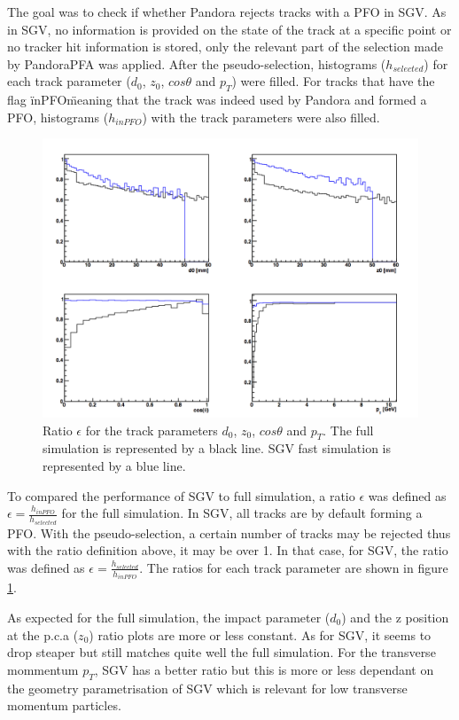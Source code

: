 The goal was to check if whether Pandora rejects tracks with a PFO in SGV. As in SGV, no information is provided on the state of the track at a specific point or no tracker hit information is stored, only the relevant part of the selection made by PandoraPFA was applied. After the pseudo-selection, histograms ($h_{selected}$) for each track parameter ($d_0$, $z_0$, $cos\theta$ and $p_T$) were filled. For tracks that have the flag \"inPFO\" meaning that the track was indeed used by Pandora and formed a PFO, histograms ($h_{inPFO}$) with the track parameters were also filled.

\begin{figure}[htbp!]
  \centering
  \includegraphics[width=1\linewidth]{Appendixes/fig_SGV/eff_track_selection_curlers.png}
  \caption{Ratio $\epsilon$ for the track parameters $d_0$, $z_0$, $cos\theta$ and $p_T$. The full simulation is represented by a black line. SGV fast simulation is represented by a blue line.}
  \label{fig:trk_select_wcurlers}
\end{figure}

To compared the performance of SGV to full simulation, a ratio $\epsilon$ was defined as $\epsilon = \frac{h_{inPFO}}{h_{selected}}$ for the full simulation. In SGV, all tracks are by default forming a PFO. With the pseudo-selection, a certain number of tracks may be rejected thus with the ratio definition above, it may be over 1. In that case, for SGV, the ratio was defined as $\epsilon = \frac{h_{selected}}{h_{inPFO}}$. The ratios for each track parameter are shown in figure \ref{fig:trk_select_wcurlers}.

As expected for the full simulation, the impact parameter ($d_0$) and the z position at the p.c.a ($z_0$) ratio plots are more or less constant. As for SGV, it seems to drop steaper but still matches quite well the full simulation. For the transverse mommentum $p_{T}$, SGV has a better ratio but this is more or less dependant on the geometry parametrisation of SGV which is relevant for low transverse momentum particles.

